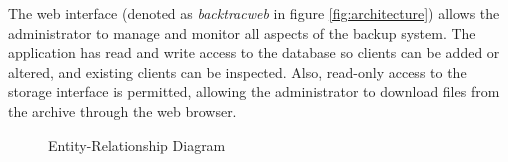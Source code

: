 The web interface (denoted as \emph{backtracweb} in figure
\ref{fig:architecture}) allows the administrator to manage and monitor all
aspects of the backup system. The application has read and write access to the
database so clients can be added or altered, and existing clients can be
inspected. Also, read-only access to the storage interface is permitted,
allowing the administrator to download files from the archive through the web
browser.

\begin{figure}[h]
    \begin{center}
        
    \end{center}
    \caption{Entity-Relationship Diagram}
    \label{fig:erd}
\end{figure}

